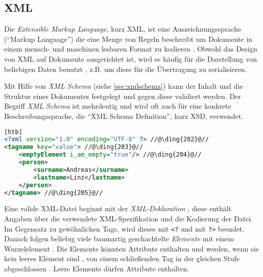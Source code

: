 \subsection{XML}

Die \emph{Extensible Markup Language}, kurz \gls{XML}, ist eine Auszeichnungssprache (\enquote{Markup Language}) die eine Menge von Regeln beschreibt um Dokumente in einem mensch- und maschinen lesbaren Format zu kodieren \cite{XML10Specification}. Obwohl das Design von XML auf Dokumente ausgerichtet ist, wird es häufig für die Darstellung von beliebigen Daten benutzt \cite{wiki:xml}, z.B. um diese für die Übertragung zu serialisieren.

Mit Hilfe von \emph{XML Schema} (siehe \cref{sec:xmlschema}) kann der Inhalt und die Struktur eines Dokumentes festgelegt und gegen diese validiert werden. Der Begriff \emph{XML Schema} ist mehrdeutig und wird oft auch für eine konkrete Beschreibungssprache, die \enquote{XML Schema Definition}, kurz \gls{XSD}, verwendet.

\begin{lstlisting}[language=XML, caption=Minimalbeispiel für eine XML-Datei][htb]
<?xml version="1.0" encoding="UTF-8" ?> //@\ding{202}@//
<tagname key="value"> //@\ding{203}@//
    <emptyElement i_am_empty="true"/> //@\ding{204}@//
    <person>
        <surname>Andreas</surname>
        <lastname>Linz</lastname>
    </person>
</tagname> //@\ding{205}@//
\end{lstlisting}

Eine valide XML-Datei beginnt mit der \emph{XML-Deklaration} , diese enthält Angaben über die verwendete XML-Spezifikation und die Kodierung der Datei. 
Im Gegensatz zu gewöhnlichen Tags, wird dieses mit \texttt{<?} und mit \texttt{?>} beendet. 
Danach folgen beliebig viele baumartig geschachtelte \emph{Elemente} mit einem Wurzelelement . Die Elemente könnten Attribute enthalten und werden, wenn sie kein leeres Element sind , von einem schließenden Tag in der gleichen Stufe abgeschlossen . Leere Elemente dürfen Attribute enthalten.
